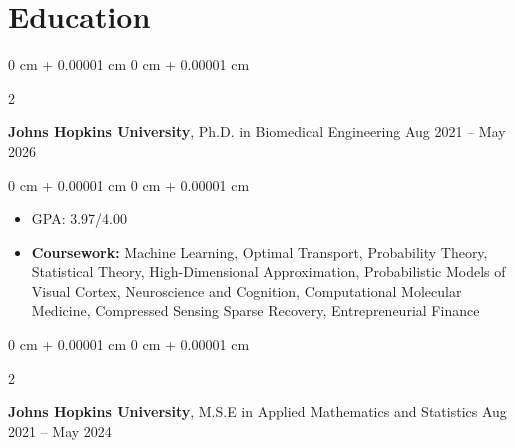 \documentclass[10pt, letterpaper]{article}
\newenvironment{highlights}{
    \begin{itemize}[
        topsep=0.10 cm,
        parsep=0.10 cm,
        partopsep=0pt,
        itemsep=0pt,
        leftmargin=0 cm + 10pt
    ]
}{
    \end{itemize}
} %
\newenvironment{onecolentry}{
    \begin{adjustwidth}{
        0 cm + 0.00001 cm
    }{
        0 cm + 0.00001 cm
    }
}{
    \end{adjustwidth}
} %
\newenvironment{twocolentry}[2][]{
    \onecolentry
    \def\secondColumn{#2}
    \setcolumnwidth{\fill, 4.5 cm}
    \begin{paracol}{2}
}{
    \switchcolumn \raggedleft \secondColumn
    \end{paracol}
    \endonecolentry
} %
\begin{document}






    \section{Education}



        
        \begin{twocolentry}{
            Aug 2021 – May 2026
        }
            \textbf{Johns Hopkins University}, Ph.D. in Biomedical Engineering\end{twocolentry}

        \vspace{0.10 cm}
        \begin{onecolentry}
            \begin{highlights}
                \item GPA: 3.97/4.00
                \item \textbf{Coursework:} Machine Learning, Optimal Transport, Probability Theory, Statistical Theory, High-Dimensional Approximation, Probabilistic Models of Visual Cortex, Neuroscience and Cognition, Computational Molecular Medicine, Compressed Sensing Sparse Recovery, Entrepreneurial Finance
            \end{highlights}
        \end{onecolentry}

        \vspace{0.20 cm}
        
        \begin{twocolentry}{
            Aug 2021 – May 2024
        }
            \textbf{Johns Hopkins University}, M.S.E in Applied Mathematics and Statistics\end{twocolentry}
\end{document}
